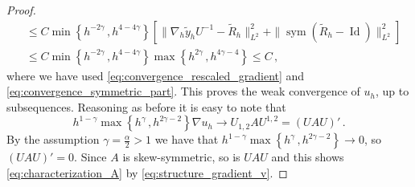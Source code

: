 \documentclass{article}
\theoremstyle{plain}
\theoremstyle{plain}
\theoremstyle{plain}
\theoremstyle{plain}
\theoremstyle{plain}
\theoremstyle{definition}
\theoremstyle{definition}
\DeclareMathOperator{\Id}{Id}
\DeclareMathOperator{\sym}{sym}
\begin{document}
\begin{proof}
\begin{align}
        & \leq C \min \left\{h^{-2\gamma} \,, h^{4 - 4\gamma}\right\} \left[ \|\nabla_h \tilde y_h U^{-1} - \tilde R_h\|_{L^2}^2 + \|\sym(\tilde R_h - \Id)\|_{L^2}^2 \right] \\
        & \leq C \min \left\{h^{-2\gamma} \,, h^{4 - 4\gamma}\right\} \max\left\{h^{2\gamma} \,, h^{4\gamma-4}\right\} \leq C \,,
    \end{align}
    where we have used \eqref{eq:convergence_rescaled_gradient} and \eqref{eq:convergence_symmetric_part}. This proves the weak convergence of $u_h$, up to subsequences. Reasoning as before it is easy to note that
    \begin{equation}
        h^{1-\gamma} \max \left\{h^{\gamma} \,, h^{2\gamma-2}\right\} \nabla u_h \to U_{1,2} A U^{1,2} = {(U A U)}' \,.
    \end{equation}
    By the assumption $\gamma = \frac{\alpha}{2} > 1$ we have that $h^{1-\gamma} \max \left\{h^{\gamma} \,, h^{2\gamma-2}\right\} \to 0$, so $(U A U)' = 0$. Since $A$ is skew-symmetric, so is $U A U$ and this shows \eqref{eq:characterization_A} by \eqref{eq:structure_gradient_v}.
\end{proof}
\end{document}
